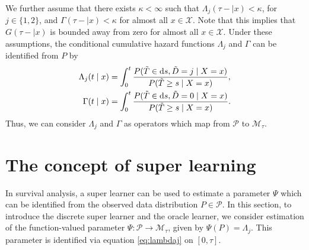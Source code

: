 We further assume that there exists \(\kappa<\infty\) such that
\(\Lambda_{j}(\tau- \mid x)<\kappa \), for \(j\in\{1,2\}\), and
\(\Gamma(\tau- \mid x)<\kappa\) for almost all \(x\in\mathcal X\). Note that this
implies that \(G(\tau- \mid x)\) is bounded away from zero for almost all \(x\in\mathcal X\).
Under these assumptions, the conditional cumulative hazard functions
\(\Lambda_{j}\) and \(\Gamma\) can be identified from \(P\) by
\begin{align}
  \Lambda_{j}(t \mid x) &= \int_0^t\frac{  P(\tilde T \in \mathop{}\!\mathrm{d} s, \tilde D=j \mid X=x )}{P(\tilde T \geq s \mid X=x )}, \label{eq:lambdaj}\\
  \Gamma(t \mid x) &= \int_0^t\frac{  P(\tilde T \in \mathop{}\!\mathrm{d} s, \tilde D=0 \mid X=x )}{P(\tilde T \geq s \mid X=x )}\label{eq:gamma}.
\end{align}
Thus, we can consider $\Lambda_j$ and \(\Gamma\) as operators which map from
\( \mathcal{P} \) to \(\mathcal M_{\tau}\).

\section{The concept of super learning}
\label{sec:super-learning}

In survival analysis, a super learner can be used to estimate a
parameter $\Psi$ which can be identified from the observed data
distribution \(P\in\mathcal P\). In this section, to introduce the
discrete super learner and the oracle learner, we consider estimation of the
function-valued parameter \(\Psi:\mathcal P\to\mathcal M_{\tau}\), given by
\(\Psi(P)=\Lambda_j\). This parameter is identified via equation
\eqref{eq:lambdaj} on \([0,\tau]\).

